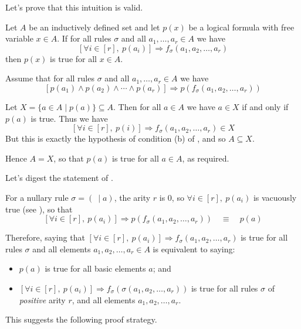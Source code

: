 Let's prove that this intuition is valid.

\begin{theorem}
\label{thmStructuralInduction}
Let $A$ be an inductively defined set and let $p(x)$ be a logical formula with free variable $x \in A$. If for all rules $\sigma$ and all $a_1,\dots,a_r \in A$ we have
\[ [\forall i \in [r],~ p(a_i)] \Rightarrow f_{\sigma}(a_1,a_2,\dots,a_r) \]
then $p(x)$ is true for all $x \in A$.
\end{theorem}

\begin{cproof}
Assume that for all rules $\sigma$ and all $a_1,\dots,a_r \in A$ we have
\[ [p(a_1) \wedge p(a_2) \wedge \cdots \wedge p(a_r)] \Rightarrow p(f_{\sigma}(a_1,a_2,\dots,a_r)) \]

Let $X = \{ a \in A \mid p(a) \} \subseteq A$. Then for all $a \in A$ we have $a \in X$ if and only if $p(a)$ is true. Thus we have
\[ [\forall i \in [r],~ p(i)] \Rightarrow f_{\sigma}(a_1,a_2,\dots,a_r) \in X \]
But this is exactly the hypothesis of condition (b) of , and so $A \subseteq X$.

Hence $A = X$, so that $p(a)$ is true for all $a \in A$, as required.
\end{cproof}

Let's digest the statement of .

For a nullary rule $\sigma = (~ \mid a)$, the arity $r$ is $0$, so $\forall i \in [r],~p(a_i)$ is vacuously true (see ), so that
\[ [\forall i \in [r],~ p(a_i)] \Rightarrow p(f_{\sigma}(a_1,a_2,\dots,a_r)) \quad \equiv \quad p(a) \]

Therefore, saying that $[\forall i \in [r],~ p(a_i)] \Rightarrow f_{\sigma}(a_1,a_2,\dots,a_r)$ is true for all rules $\sigma$ and all elements $a_1,a_2,\dots,a_r \in A$ is equivalent to saying:
\begin{itemize}
\item $p(a)$ is true for all basic elements $a$; and
\item $[\forall i \in [r],~ p(a_i)] \Rightarrow f_{\sigma}(\sigma(a_1,a_2,\dots,a_r))$ is true for all rules $\sigma$ of \textit{positive} arity $r$, and all elements $a_1,a_2,\dots,a_r$.
\end{itemize}

This suggests the following proof strategy.

